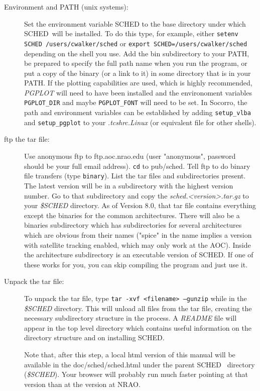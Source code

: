 \documentclass{report}
\newcommand{\sched}{{\sc SCHED}}
\newcommand{\schedb}{{\sc SCHED~}}
\begin{document}
\begin{description}

\item [Environment and PATH (unix systems):] Set the environment
variable SCHED to the base directory under which \schedb will be
installed.  To do this type, for example, either {\tt setenv SCHED 
/users/cwalker/sched} or {\tt export SCHED=/users/cwalker/sched}
depending on the
shell you use.  Add the bin subdirectory to your PATH, be prepared to
specify the full path name when you run the program, or put a copy of
the binary (or a link to it) in some directory that is in your PATH.
If the plotting capabilities are used, which is highly recommended,
{\sl PGPLOT} will need to have been installed and the environoment
variables {\tt PGPLOT\_DIR} and maybe {\tt PGPLOT\_FONT} will need to be
set.  In Socorro, the path and environment variables can be
established by adding {\tt setup\_vlba} and {\tt setup\_pgplot} to your
{\sl .tcshrc.Linux} (or equivalent file for other shells).

\item [ftp the tar file:] Use anonymous ftp to ftp.aoc.nrao.edu (user
"anonymous", password should be your full email address).  {\tt cd} to
pub/sched.  Tell ftp to do binary file transfers (type {\tt binary}).
List the tar files and subdirectories present.  The latest version
will be in a subdirectory with the highest version number.  Go to that
subdirectory and copy the {\sl sched.<version>.tar.gz} to your {\sl
\$SCHED} directory.  As of Version 8.0, that tar file contains
everything except the binaries for the common architectures. There
will also be a binaries subdirectory which has subdirectories for
several architectures which are obvious from their names ("spice" in
the name implies a version with satellite tracking enabled, which may
only work at the AOC).  Inside the architecture subdirectory is an
executable version of \sched.  If one of these works for you, you can
skip compiling the program and just use it.

\item [Unpack the tar file:] To unpack the tar file, type {\tt tar
-xvf <filename> --gunzip} while in the {\sl \$SCHED} directory.  This
will unload all files from the tar file, creating the necessary
subdirectory structure in the process.  A {\sl README} file will
appear in the top level directory which contains useful information on
the directory structure and on installing \sched.

Note that, after this step, a local html version of this manual will
be available in the doc/sched/sched.html under the parent \schedb
directory ({\sl \$SCHED}).  Your browser will probably run much faster
pointing at that version than at the version at NRAO.


\end{description}
\end{document}
